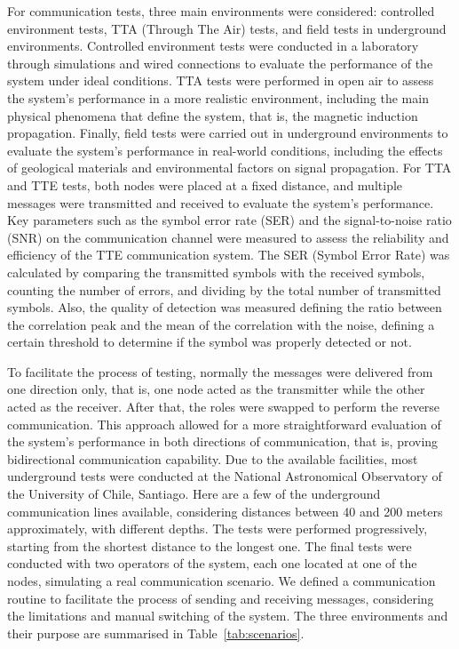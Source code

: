 For communication tests, three main environments were considered: controlled environment tests, TTA (Through The Air) tests, and field tests in underground environments.
\newp
Controlled environment tests were conducted in a laboratory through simulations and wired connections to evaluate the performance of the system under ideal conditions.
\newp
TTA tests were performed in open air to assess the system's performance in a more realistic environment, including the main physical phenomena that define the system, that is, the magnetic induction propagation.
Finally, field tests were carried out in underground environments to evaluate the system's performance in real-world conditions, including the effects of geological materials and environmental factors on signal propagation.
\newp
For TTA and TTE tests, both nodes were placed at a fixed distance, and multiple messages were transmitted and received to evaluate the system's performance. Key parameters such as the symbol error rate (SER) and the signal-to-noise ratio (SNR) on the communication channel were measured to assess the reliability and efficiency of the TTE communication system.
\newp
The SER (Symbol Error Rate) was calculated by comparing the transmitted symbols with the received symbols, counting the number of errors, and dividing by the total number of transmitted symbols. Also, the quality of detection was measured defining the ratio between the correlation peak and the mean of the correlation with the noise, defining a certain threshold to determine if the symbol was properly detected or not.

\newp

To facilitate the process of testing, normally the messages were delivered from one direction only, that is, one node acted as the transmitter while the other acted as the receiver. After that, the roles were swapped to perform the reverse communication. This approach allowed for a more straightforward evaluation of the system's performance in both directions of communication, that is, proving bidirectional communication capability.
\newp
Due to the available facilities, most underground tests were conducted at the National Astronomical Observatory of the University of Chile, Santiago. Here are a few of the underground communication lines available, considering distances between 40 and 200 meters approximately, with different depths. The tests were performed progressively, starting from the shortest distance to the longest one.
\newp
The final tests were conducted with two operators of the system, each one located at one of the nodes, simulating a real communication scenario. We defined a communication routine to facilitate the process of sending and receiving messages, considering the limitations and manual switching of the system.
\newp
The three environments and their purpose are summarised in Table~\ref{tab:scenarios}.


